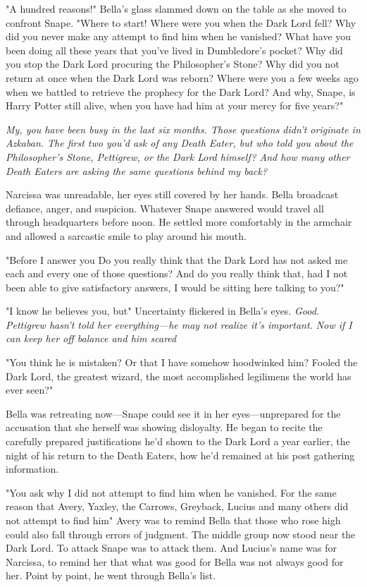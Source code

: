 "A hundred reasons!" Bella's glass slammed down on the table as she moved to confront Snape. "Where to start! Where were you when the Dark Lord fell? Why did you never make any attempt to find him when he vanished? What have you been doing all these years that you've lived in Dumbledore's pocket? Why did you stop the Dark Lord procuring the Philosopher's Stone? Why did you not return at once when the Dark Lord was reborn? Where were you a few weeks ago when we battled to retrieve the prophecy for the Dark Lord? And why, Snape, is Harry Potter still alive, when you have had him at your mercy for five years?"

\emph{My, you have been busy in the last six months. Those questions didn't originate in Azkaban. The first two you'd ask of any Death Eater, but who told you about the Philosopher's Stone, Pettigrew, or the Dark Lord himself? And how many other Death Eaters are asking the same questions behind my back?}

Narcissa was unreadable, her eyes still covered by her hands. Bella broadcast defiance, anger, and suspicion. Whatever Snape answered would travel all through headquarters before noon. He settled more comfortably in the armchair and allowed a sarcastic smile to play around his mouth.

"Before I answer you{\el} Do you really think that the Dark Lord has not asked me each and every one of those questions? And do you really think that, had I not been able to give satisfactory answers, I would be sitting here talking to you?"

"I know he believes you, but{\el}" Uncertainty flickered in Bella's eyes. \emph{Good. Pettigrew hasn't told her everything—he may not realize it's important. Now if I can keep her off balance and him scared{\el}}

"You think he is mistaken? Or that I have somehow hoodwinked him? Fooled the Dark Lord, the greatest wizard, the most accomplished legilimens the world has ever seen?"

Bella was retreating now—Snape could see it in her eyes—unprepared for the accusation that she herself was showing disloyalty. He began to recite the carefully prepared justifications he'd shown to the Dark Lord a year earlier, the night of his return to the Death Eaters, how he'd remained at his post gathering information.

"You ask why I did not attempt to find him when he vanished. For the same reason that Avery, Yaxley, the Carrows, Greyback, Lucius and many others did not attempt to find him{\el}" Avery was to remind Bella that those who rose high could also fall through errors of judgment. The middle group now stood near the Dark Lord. To attack Snape was to attack them. And Lucius's name was for Narcissa, to remind her that what was good for Bella was not always good for her. Point by point, he went through Bella's list.

